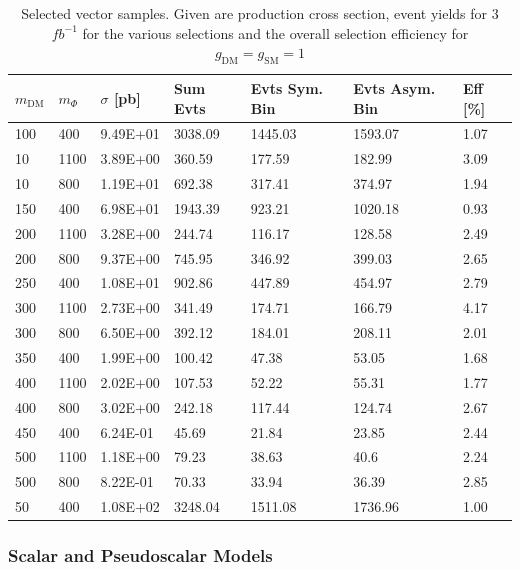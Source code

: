 \begin{table}[h]
\centering
\begin{tabular}{lllllll}
\hline
$m_\textrm{DM}$ & $m_\Phi$             & $\sigma$ [pb] & Sum Evts       & Evts Sym. Bin & Evts Asym. Bin & Eff  [\%]   \\\hline
100   &  400  & 9.49E+01 & 3038.09 & 1445.03 & 1593.07 & 1.07 \\
10   &  1100  & 3.89E+00 & 360.59  & 177.59  & 182.99  & 3.09 \\
10   &  800   & 1.19E+01 & 692.38  & 317.41  & 374.97  & 1.94 \\
150   &  400  & 6.98E+01 & 1943.39 & 923.21  & 1020.18 & 0.93 \\
200   &  1100 & 3.28E+00 & 244.74  & 116.17  & 128.58  & 2.49 \\
200   &  800  & 9.37E+00 & 745.95  & 346.92  & 399.03  & 2.65 \\
250   &  400  & 1.08E+01 & 902.86  & 447.89  & 454.97  & 2.79 \\
300   &  1100 & 2.73E+00 & 341.49  & 174.71  & 166.79  & 4.17 \\
300   &  800  & 6.50E+00 & 392.12  & 184.01  & 208.11  & 2.01 \\
350   &  400  & 1.99E+00 & 100.42  & 47.38   & 53.05   & 1.68 \\
400   &  1100 & 2.02E+00 & 107.53  & 52.22   & 55.31   & 1.77 \\
400   &  800  & 3.02E+00 & 242.18  & 117.44  & 124.74  & 2.67 \\
450   &  400  & 6.24E-01 & 45.69   & 21.84   & 23.85   & 2.44 \\
500   &  1100 & 1.18E+00 & 79.23   & 38.63   & 40.6    & 2.24 \\
500   &  800  & 8.22E-01 & 70.33   & 33.94   & 36.39   & 2.85 \\
50   &  400   & 1.08E+02 & 3248.04 & 1511.08 & 1736.96 & 1.00 \\
\hline
\end{tabular}
\caption{Selected vector samples. Given are production cross section, event yields for 3 $fb^{-1 }$ for the various selections and the overall selection efficiency for $g_\textrm{DM}=g_\textrm{SM}=1$}
\label{tab:dm_V_g1_3fb}
\end{table}




\clearpage
\subsubsection{Scalar and Pseudoscalar Models} \label{sec:dm_pscalar}

